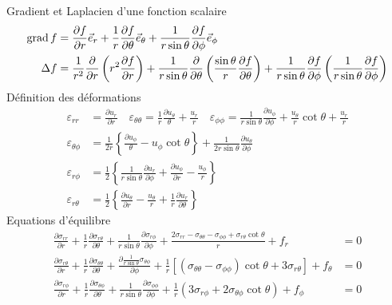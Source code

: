 Gradient et Laplacien d'une fonction scalaire
\begin{align*}
    \operatorname*{\mathrm{grad}} f &= \frac{\partial f}{\partial r} \vec{e}_r + \frac{1}{r} \frac{\partial f}{\partial \theta} \vec{e}_{\theta} + \frac{1}{r\sin \theta} \frac{\partial f}{\partial \phi} \vec{e}_{\phi} \\
    \Delta f &= \frac{1}{r^2} \frac{\partial}{\partial r} \left( r^2 \frac{\partial f}{\partial r} \right) + \frac{1}{r\sin \theta} \frac{\partial}{\partial \theta}\left( \frac{\sin \theta}{r} \frac{\partial f}{\partial \theta} \right) + \frac{1}{r\sin \theta}\frac{\partial f}{\partial \phi} \left( \frac{1}{r\sin \theta} \frac{\partial f}{\partial \phi} \right)
\end{align*}
Définition des déformations
\begin{align*}
    \varepsilon_{rr} &= \frac{\partial u_r}{\partial r} \quad \varepsilon_{\theta\theta} = \frac{1}{r} \frac{\partial u_{\theta}}{\theta} + \frac{u_r}{r} \quad \varepsilon_{\phi\phi} = \frac{1}{r \sin \theta} \frac{\partial u_{\phi}}{\partial \phi} + \frac{u_{\theta}}{r}\cot \theta + \frac{u_r}{r} \\
    \varepsilon_{\theta \phi} &= \frac{1}{2r} \left\{ \frac{\partial u_{\phi}}{\theta} - u_{\phi} \cot \theta \right\} + \frac{1}{2r\sin \theta} \frac{\partial u_{\theta}}{\partial \phi} \\
    \varepsilon_{r\phi} &= \frac{1}{2} \left\{ \frac{1}{r \sin \theta} \frac{\partial u_r}{\partial \phi} + \frac{\partial u_\phi}{\partial r} - \frac{u_{\phi}}{r}\right\} \\
    \varepsilon_{r\theta} &= \frac{1}{2} \left\{ \frac{\partial u_{\theta}}{\partial r} - \frac{u_{\theta}}{r} + \frac{1}{r} \frac{\partial u_r}{\partial \theta} \right\}
\end{align*}
Equations d'équilibre
\begin{align*}
    \frac{\partial \sigma_{rr}}{\partial r} + \frac{1}{r} \frac{\partial \sigma_{r\theta}}{\partial \theta} + \frac{1}{r \sin \theta} \frac{\partial \sigma_{r\phi}}{\partial \phi} + \frac{2 \sigma_{rr} - \sigma_{\theta\theta} -\sigma_{\phi\phi} +\sigma_{r\theta} \cot \theta}{r} + f_r &=0\\
    \frac{\partial \sigma_{r\theta}}{\partial r} + \frac{1}{r} \frac{\partial \sigma_{\theta\theta}}{\partial \theta} + \frac{\partial \frac{1}{r \sin \theta} \sigma_{\theta \phi}}{\partial \phi} + \frac{1}{r} \left[ \left( \sigma_{\theta\theta} -\sigma_{\phi\phi} \right)\cot\theta +3\sigma_{r\theta} \right]+ f_{\theta} &=0\\
    \frac{\partial \sigma_{r\phi}}{\partial r} + \frac{1}{r} \frac{\partial \sigma_{\theta \phi}}{\partial \theta} + \frac{1}{r \sin \theta} \frac{\partial \sigma_{\phi\phi}}{\partial \phi} + \frac{1}{r}\left( 3\sigma_{r\phi} + 2 \sigma_{\theta\phi}\cot \theta \right) + f_\phi &=0
\end{align*}

